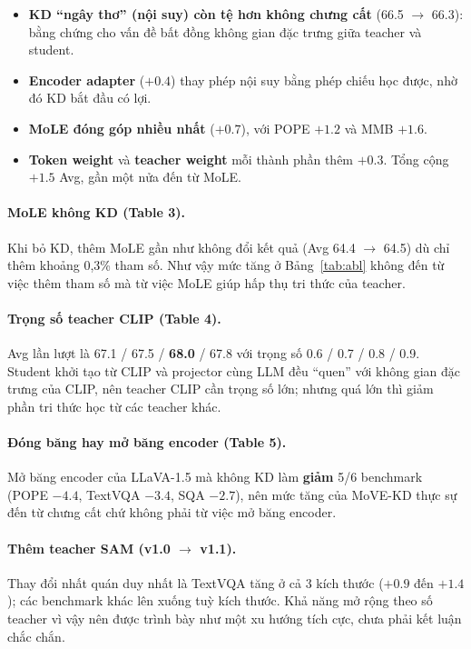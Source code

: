 \documentclass[11pt,a4paper]{article}
\begin{document}
\begin{itemize}
\item \textbf{KD ``ngây thơ'' (nội suy) còn tệ hơn không chưng cất} (66.5 $\rightarrow$ 66.3): bằng chứng cho vấn đề bất đồng không gian đặc trưng giữa teacher và student.
\item \textbf{Encoder adapter} ($+0.4$) thay phép nội suy bằng phép chiếu học được, nhờ đó KD bắt đầu có lợi.
\item \textbf{MoLE đóng góp nhiều nhất} ($+0.7$), với POPE $+1.2$ và MMB $+1.6$.
\item \textbf{Token weight} và \textbf{teacher weight} mỗi thành phần thêm $+0.3$. Tổng cộng $+1.5$ Avg, gần một nửa đến từ MoLE.
\end{itemize}

\paragraph{MoLE không KD (Table 3).} Khi bỏ KD, thêm MoLE gần như không đổi kết quả (Avg 64.4 $\rightarrow$ 64.5) dù chỉ thêm khoảng 0,3\% tham số. Như vậy mức tăng ở Bảng~\ref{tab:abl} không đến từ việc thêm tham số mà từ việc MoLE giúp hấp thụ tri thức của teacher.

\paragraph{Trọng số teacher CLIP (Table 4).} Avg lần lượt là 67.1 / 67.5 / \textbf{68.0} / 67.8 với trọng số 0.6 / 0.7 / 0.8 / 0.9. Student khởi tạo từ CLIP và projector cùng LLM đều ``quen'' với không gian đặc trưng của CLIP, nên teacher CLIP cần trọng số lớn; nhưng quá lớn thì giảm phần tri thức học từ các teacher khác.

\paragraph{Đóng băng hay mở băng encoder (Table 5).} Mở băng encoder của LLaVA-1.5 mà không KD làm \textbf{giảm} 5/6 benchmark (POPE $-4.4$, TextVQA $-3.4$, SQA $-2.7$), nên mức tăng của MoVE-KD thực sự đến từ chưng cất chứ không phải từ việc mở băng encoder.

\paragraph{Thêm teacher SAM (v1.0 $\rightarrow$ v1.1).} Thay đổi nhất quán duy nhất là TextVQA tăng ở cả 3 kích thước ($+0.9$ đến $+1.4$); các benchmark khác lên xuống tuỳ kích thước. Khả năng mở rộng theo số teacher vì vậy nên được trình bày như một xu hướng tích cực, chưa phải kết luận chắc chắn.
\end{document}
